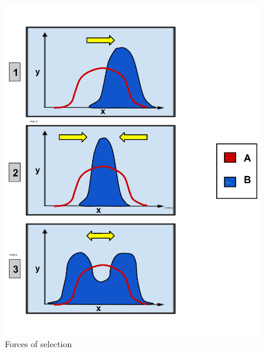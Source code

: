 \begin{figure}[htb]
    \centering
    \includegraphics[width=\textwidth]{chapter5/figures/fig5.1.pdf}
    \caption{Forces of selection}
    \label{fig:5.1}
\end{figure}

